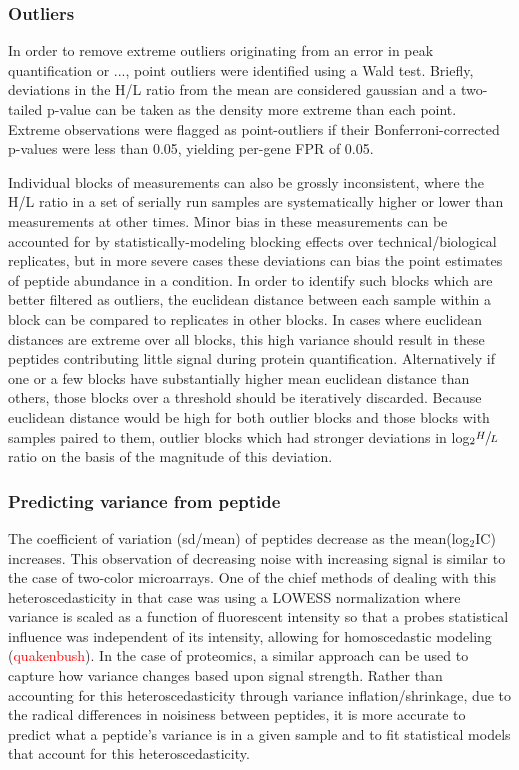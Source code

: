 \documentclass[12pt]{article}
\begin{document}
\subsubsection*{Outliers}

In order to remove extreme outliers originating from an error in peak quantification or ..., point outliers were identified using a Wald test.  Briefly, deviations in the H/L ratio from the mean are considered gaussian and a two-tailed p-value can be taken as the density more extreme than each point.  Extreme observations were flagged as point-outliers if their Bonferroni-corrected p-values were less than 0.05, yielding per-gene FPR of 0.05.

Individual blocks of measurements can also be grossly inconsistent, where the H/L ratio in a set of serially run samples are systematically higher or lower than measurements at other times.  Minor bias in these measurements can be accounted for by statistically-modeling blocking effects over technical/biological replicates, but in more severe cases these deviations can bias the point estimates of peptide abundance in a condition.  In order to identify such blocks which are better filtered as outliers, the euclidean distance between each sample within a block can be compared to replicates in other blocks.  In cases where euclidean distances are extreme over all blocks, this high variance should  result in these peptides contributing little signal during protein quantification.  Alternatively if one or a few blocks have substantially higher mean euclidean distance than others, those blocks over a threshold should be iteratively discarded.  Because euclidean distance would be high for both outlier blocks and those blocks with samples paired to them, outlier blocks which had stronger deviations in log$_{2}\sfrac{H}{L}$ ratio on the basis of the magnitude of this deviation.

\subsubsection*{Predicting variance from peptide }

The coefficient of variation (sd/mean) of peptides decrease as the mean(log$_{2}$IC) increases.  This observation of decreasing noise with increasing signal is similar to the case of two-color microarrays.  One of the chief methods of dealing with this heteroscedasticity in that case was using a LOWESS normalization where variance is scaled as a function of fluorescent intensity so that a probes statistical influence was independent of its intensity, allowing for homoscedastic modeling (\textcolor{red}{quakenbush}).  In the case of proteomics, a similar approach can be used to capture how variance changes based upon signal strength.  Rather than accounting for this heteroscedasticity through variance inflation/shrinkage, due to the radical differences in noisiness between peptides, it is more accurate to predict what a peptide's variance is in a given sample and to fit statistical models that account for this heteroscedasticity.
\end{document}
